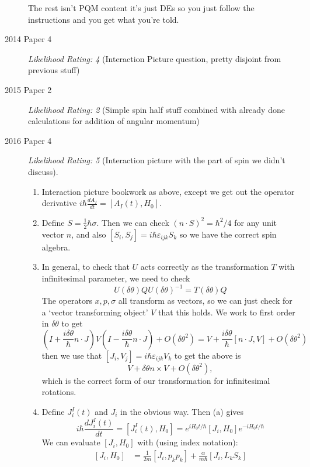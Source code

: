 \documentclass[a4paper]{scrartcl}
\begin{document}
\begin{description}
    The rest isn't PQM content it's just DEs so you just follow the instructions and you get what you're told.

    \item [2014 Paper 4] \emph{Likelihood Rating: 4} (Interaction Picture question, pretty disjoint from previous stuff)
    \item [2015 Paper 2] \emph{Likelihood Rating: 2} (Simple spin half stuff combined with already done calculations for addition of angular momentum)
    \item [2016 Paper 4] \emph{Likelihood Rating: 5} (Interaction picture with the part of spin we didn't discuss).
    
    \begin{enumerate}[label=(\alph*)]
        \item Interaction picture bookwork as above, except we get out the operator derivative $i \hbar \frac{d A_I}{dt} = [A_I(t), H_0]$.
        \item Define $S = \frac{1}{2} \hbar \sigma$. Then we can check $(n \cdot S)^2 = \hbar^2/4$ for any unit vector $n$, and also $[S_i, S_j] = i \hbar \varepsilon_{ijk} S_k$ so we have the correct spin algebra.
        \item In general, to check that $U$ acts correctly as the transformation $T$ with infinitesimal parameter, we need to check
        $$U(\delta \theta) Q U(\delta \theta)^{-1}= T(\delta \theta) Q$$
        The operators $x, p, \sigma$ all transform as vectors, so we can just check for a `vector transforming object' $V$ that this holds. 
        We work to first order in $\delta \theta$ to get
        $$
        \left(I + \frac{i \delta \theta}{\hbar} n \cdot J\right) V \left(I - \frac{i \delta \theta}{\hbar} n \cdot J\right) + O(\delta \theta^2) = V + \frac{i \delta \theta}{\hbar} [n \cdot J, V] + O(\delta \theta^2)
        $$
        then we use that $[J_i, V_j] = i \hbar \varepsilon_{ijk} V_k$ to get the above is
        $$
        V + \delta \theta n \times V + O(\delta \theta^2),
        $$
        which is the correct form of our transformation for infinitesimal rotations.
        \item Define $J_i^I(t)$ and $J_i$ in the obvious way. Then (a) gives
        $$
        i \hbar \frac{d J_i^I(t)}{d t}=\left[J_i^I(t), H_0\right]=e^{i H_0 t / \hbar}\left[J_i, H_0\right] e^{-i H_0 t / \hbar}
        $$
        We can evaluate $\left[J_i, H_0\right]$ with (using index notation):
        \begin{align*}
            \left[J_i, H_0\right]&=\frac{1}{2 m}\left[J_i, p_k p_k\right]+\frac{\alpha}{m \hbar}\left[J_i, L_k S_k\right]\\

\end{align*}
\end{enumerate}
\end{description}
\end{document}
